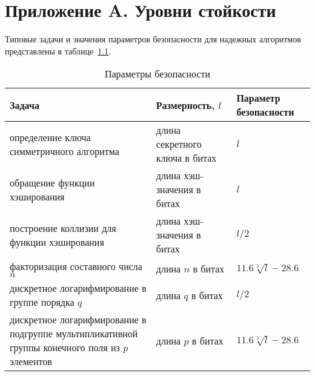 \chapter{Приложение A. Уровни стойкости}

Типовые задачи и значения параметров безопасности для надежных алгоритмов
представлены в таблице~\ref{Table.COMMON.Strength}.

\begin{table}[bht]
\caption{Параметры безопасности}\label{Table.COMMON.Strength}
\begin{center}
\begin{tabular}{|p{7.3cm}|p{6cm}|p{2.5cm}|}
\hline
Задача & Размерность, $l$ & Параметр безопасности\\
\hline
\hline
определение ключа симметричного алгоритма & 
длина секретного ключа в битах & $l$\\
%
\hline
обращение функции хэширования & 
длина хэш-значения в битах & $l$\\
%
\hline
построение коллизии для функции хэширования & 
длина хэш-значения в битах & $l/2$\\
%
\hline
факторизация составного числа $n$ & 
длина $n$ в битах & 
$11.6\sqrt[3]{l}-28.6$\\
%
\hline
дискретное логарифмирование в группе порядка $q$ & 
длина $q$ в битах & 
$l/2$\\
%
\hline
дискретное логарифмирование в подгруппе мультипликативной группы 
конечного поля из $p$ элементов & 
длина $p$ в битах & 
$11.6\sqrt[3]{l}-28.6$\\
\hline
\end{tabular}
\end{center}
\end{table}

